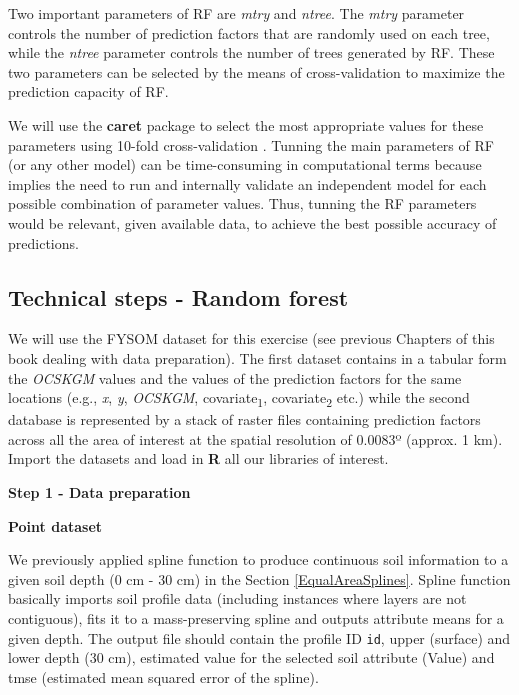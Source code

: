 \documentclass[10pt,b5paper,]{book}
\theoremstyle{definition}
\theoremstyle{definition}
\theoremstyle{definition}
\theoremstyle{remark}
\begin{document}
Two important parameters of RF are \emph{mtry} and \emph{ntree}. The
\emph{mtry} parameter controls the number of prediction factors that are
randomly used on each tree, while the \emph{ntree} parameter controls
the number of trees generated by RF. These two parameters can be
selected by the means of cross-validation to maximize the prediction
capacity of RF.

We will use the \textbf{caret} package to select the most appropriate
values for these parameters using 10-fold cross-validation
\citep{kuhn2017caret}. Tunning the main parameters of RF (or any other
model) can be time-consuming in computational terms because implies the
need to run and internally validate an independent model for each
possible combination of parameter values. Thus, tunning the RF
parameters would be relevant, given available data, to achieve the best
possible accuracy of predictions.

\hypertarget{technical-steps---random-forest}{%
\subsection{Technical steps - Random
forest}\label{technical-steps---random-forest}}

We will use the FYSOM dataset for this exercise (see previous Chapters
of this book dealing with data preparation). The first dataset contains
in a tabular form the \emph{OCSKGM} values and the values of the
prediction factors for the same locations (e.g., \emph{x}, \emph{y},
\emph{OCSKGM}, covariate\textsubscript{1}, covariate\textsubscript{2}
etc.) while the second database is represented by a stack of raster
files containing prediction factors across all the area of interest at
the spatial resolution of 0.0083º (approx. 1 km). Import the datasets
and load in \textbf{R} all our libraries of interest.

\textbf{Step 1 - Data preparation}

\textbf{Point dataset}

We previously applied spline function to produce continuous soil
information to a given soil depth (0 cm - 30 cm) in the Section
\ref{EqualAreaSplines}. Spline function basically imports soil profile
data (including instances where layers are not contiguous), fits it to a
mass-preserving spline and outputs attribute means for a given depth.
The output file should contain the profile ID \texttt{id}, upper
(surface) and lower depth (30 cm), estimated value for the selected soil
attribute (Value) and tmse (estimated mean squared error of the spline).
\end{document}
